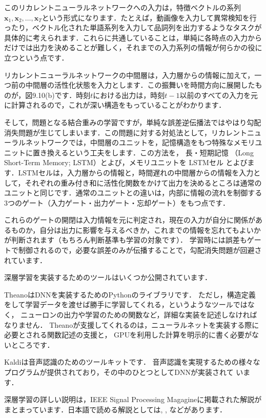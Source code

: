 このリカレントニューラルネットワークへの入力は，特徴ベクトルの系列$\bm{x}_1,\bm{x}_2,\dots, \bm{x}_T $という形式になります．たとえば，動画像を入力して異常検知を行ったり，ベクトル化された単語系列を入力して品詞列を出力するようなタスクが具体的に考えられます．これらに共通していることは，単純に各時点の入力からだけでは出力を決めることが難しく，それまでの入力系列の情報が何らかの役に立つという点です．

リカレントニューラルネットワークの中間層は，入力層からの情報に加えて，一つ前の中間層の活性化状態を入力とします．この振舞いを時間方向に展開したものが，図9.10(b)です．時刻$t$における出力は，時刻$t-1$以前のすべての入力を元に計算されるので，これが深い構造をもっていることがわかります．


そして，問題となる結合重みの学習ですが，単純な誤差逆伝播法ではやはり勾配消失問題が生じてしまいます．この問題に対する対処法として，リカレントニューラルネットワークでは，中間層のユニットを，記憶構造をもつ特殊なメモリユニットに置き換えるという工夫をします．この方法を，
長・短期記憶
（Long Short-Term Memory; LSTM）とよび，メモリユニットを
LSTMセル
とよびます．LSTMセルは，入力層からの情報と，時間遅れの中間層からの情報を入力として，それぞれの重み付き和に活性化関数をかけて出力を決めるところは通常のユニットと同じです．通常のユニットとの違いは，内部に情報の流れを制御する3つのゲート（入力ゲート・出力ゲート・忘却ゲート）をもつ点です．


これらのゲートの開閉は入力情報を元に判定され，現在の入力が自分に関係があるものか，自分は出力に影響を与えるべきか，これまでの情報を忘れてもよいかが判断されます（もちろん判断基準も学習の対象です）．
学習時には誤差もゲートで制御されるので，必要な誤差のみが伝播することで，勾配消失問題が回避されています．


深層学習を実装するためのツールはいくつか公開されています．

TheanoはDNNを実装するためのPythonのライブラリです．
ただし，構造定義をして学習データを渡せば勝手に学習してくれる，というようなツールではなく，
ニューロンの出力や学習のための関数など，詳細な実装を記述しなければなりません．
Theanoが支援してくれるのは，ニューラルネットを実装する際に必要とされる関数記述の支援と，
GPUを利用した計算を明示的に書く必要がないところです．

Kaldiは音声認識のためのツールキットです．
音声認識を実現するための様々なプログラムが提供されており，その中のひとつとしてDNNが実装されて
います．

深層学習の詳しい説明は，IEEE Signal Processing Magagineに掲載された解説\cite{hinton12}が
まとまっています．日本語で読める解説としては\cite{kubo13}, \cite{yasuda13}, \cite{aso13}などがあります．

